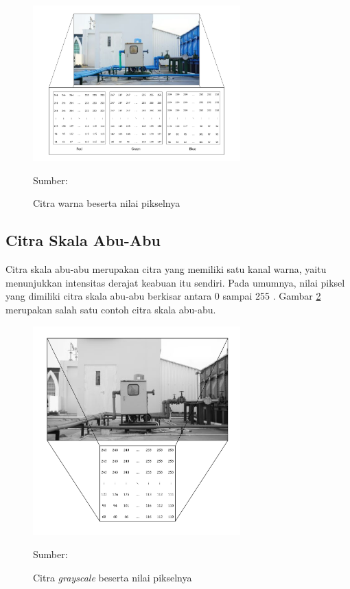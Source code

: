     \begin{figure}[H]
        \begin{center}
            \includegraphics[width=8cm]{../img/Color - Latex.png}
            \caption{Citra warna beserta nilai pikselnya}
            \label{fig:color}
            Sumber: \citep{Kusumanto2011}
        \end{center}
    \end{figure}

    \subsection{Citra Skala Abu-Abu}
    Citra skala abu-abu merupakan citra yang memiliki satu kanal warna, yaitu menunjukkan intensitas derajat keabuan itu sendiri. Pada umumnya, nilai piksel yang dimiliki citra skala abu-abu berkisar antara 0 sampai 255 \citep{Kusumanto2011}. Gambar \ref{fig:grayscale} merupakan salah satu contoh citra skala abu-abu.

    \begin{figure}[H]
        \begin{center}
            \includegraphics[width=8cm]{../img/Grayscale - Latex.png}
            \caption{Citra \textit{grayscale} beserta nilai pikselnya}
            \label{fig:grayscale}
            Sumber: \citep{Kusumanto2011}
        \end{center}
    \end{figure}

